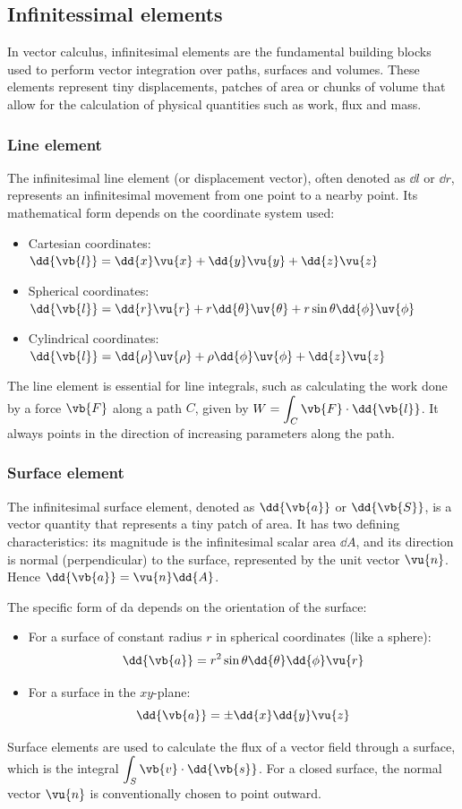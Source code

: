 	\subsection{Infinitessimal elements}
		In vector calculus, infinitesimal elements are the fundamental building blocks used to perform vector integration over paths, surfaces and volumes. These elements represent tiny displacements, patches of area or chunks of volume that allow for the calculation of physical quantities such as work, flux and mass.
	
		\subsubsection{Line element}
			The infinitesimal line element (or displacement vector), often denoted as $\dd{l}$ or $\dd{r}$, represents an infinitesimal movement from one point to a nearby point. Its mathematical form depends on the coordinate system used:
			\begin{itemize}
				\item Cartesian coordinates: $\dd{\vb{l}}=\dd{x}\vu{x}+\dd{y}\vu{y}+\dd{z}\vu{z}$
				\item Spherical coordinates: $\dd{\vb{l}}=\dd{r}\vu{r}+r\dd{\theta}\uv{\theta}+r\sin{\theta}\dd{\phi}\uv{\phi}$
				\item Cylindrical coordinates: $\dd{\vb{l}}=\dd{\rho}\uv{\rho}+\rho\dd{\phi}\uv{\phi}+\dd{z}\vu{z}$
			\end{itemize}
			The line element is essential for line integrals, such as calculating the work done by a force $\vb{F}$ along a path $C$, given by $\displaystyle W=\int_C{\vb{F}\cdot\dd{\vb{l}}}$. It always points in the direction of increasing parameters along the path.
		
		\subsubsection{Surface element}
			The infinitesimal surface element, denoted as $\dd{\vb{a}}$ or $\dd{\vb{S}}$, is a vector quantity that represents a tiny patch of area. It has two defining characteristics: its magnitude is the infinitesimal scalar area $\dd{A}$, and its direction is normal (perpendicular) to the surface, represented by the unit vector $\vu{n}$. Hence $\dd{\vb{a}}=\vu{n}\dd{A}$.
			
			The specific form of da depends on the orientation of the surface:
			\begin{itemize}
				\item For a surface of constant radius $r$ in spherical coordinates (like a sphere):
				$$\dd{\vb{a}}=r^2\sin{\theta}\dd{\theta}\dd{\phi}\vu{r}$$
				\item For a surface in the $xy$-plane:
				$$\dd{\vb{a}}=\pm\dd{x}\dd{y}\vu{z}$$
			\end{itemize}
			Surface elements are used to calculate the flux of a vector field through a surface, which is the integral $\displaystyle \int_S{\vb{v}\cdot\dd{\vb{s}}}$. For a closed surface, the normal vector $\vu{n}$ is conventionally chosen to point outward.
		
